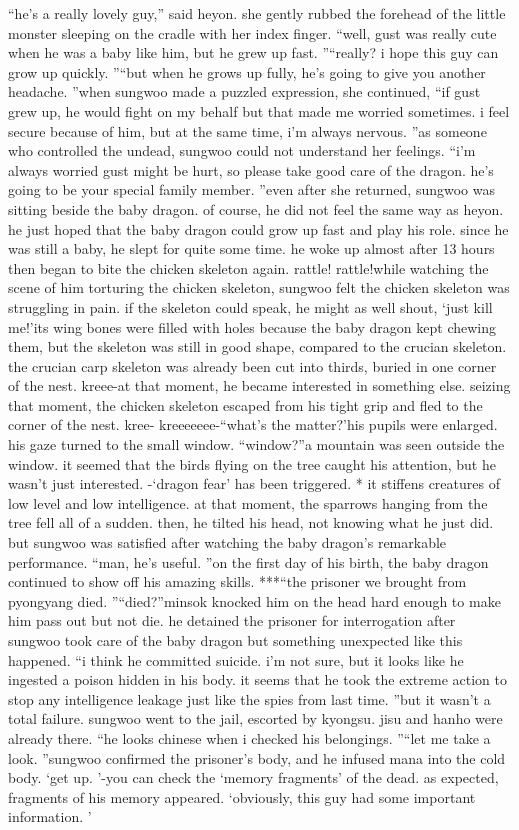 “he’s a really lovely guy,” said heyon.
she gently rubbed the forehead of the little monster sleeping on the cradle with her index finger.
“well, gust was really cute when he was a baby like him, but he grew up fast.
”“really? i hope this guy can grow up quickly.
”“but when he grows up fully, he’s going to give you another headache.
”when sungwoo made a puzzled expression, she continued, “if gust grew up, he would fight on my behalf but that made me worried sometimes.
 i feel secure because of him, but at the same time, i’m always nervous.
”as someone who controlled the undead, sungwoo could not understand her feelings.
“i’m always worried gust might be hurt, so please take good care of the dragon.
 he’s going to be your special family member.
”even after she returned, sungwoo was sitting beside the baby dragon.
of course, he did not feel the same way as heyon.
 he just hoped that the baby dragon could grow up fast and play his role.
since he was still a baby, he slept for quite some time.
 he woke up almost after 13 hours then began to bite the chicken skeleton again.
rattle! rattle!while watching the scene of him torturing the chicken skeleton, sungwoo felt the chicken skeleton was struggling in pain.
 if the skeleton could speak, he might as well shout, ‘just kill me!’its wing bones were filled with holes because the baby dragon kept chewing them, but the skeleton was still in good shape, compared to the crucian skeleton.
 the crucian carp skeleton was already been cut into thirds, buried in one corner of the nest.
kreee-at that moment, he became interested in something else.
 seizing that moment, the chicken skeleton escaped from his tight grip and fled to the corner of the nest.
kree- kreeeeeee-“what’s the matter?’his pupils were enlarged.
 his gaze turned to the small window.
“window?”a mountain was seen outside the window.
 it seemed that the birds flying on the tree caught his attention, but he wasn’t just interested.
-‘dragon fear’ has been triggered.
* it stiffens creatures of low level and low intelligence.
at that moment, the sparrows hanging from the tree fell all of a sudden.
then, he tilted his head, not knowing what he just did.
 but sungwoo was satisfied after watching the baby dragon’s remarkable performance.
“man, he’s useful.
”on the first day of his birth, the baby dragon continued to show off his amazing skills.
***“the prisoner we brought from pyongyang died.
”“died?”minsok knocked him on the head hard enough to make him pass out but not die.
he detained the prisoner for interrogation after sungwoo took care of the baby dragon but something unexpected like this happened.
“i think he committed suicide.
 i’m not sure, but it looks like he ingested a poison hidden in his body.
 it seems that he took the extreme action to stop any intelligence leakage just like the spies from last time.
”but it wasn’t a total failure.
sungwoo went to the jail, escorted by kyongsu.
 jisu and hanho were already there.
“he looks chinese when i checked his belongings.
”“let me take a look.
”sungwoo confirmed the prisoner’s body, and he infused mana into the cold body.
‘get up.
’-you can check the ‘memory fragments’ of the dead.
as expected, fragments of his memory appeared.
‘obviously, this guy had some important information.
’

